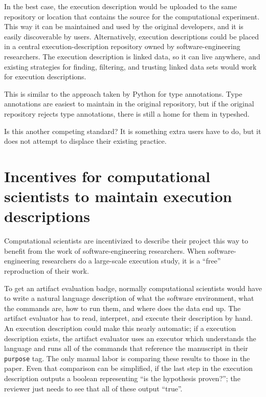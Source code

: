 \documentclass[manuscript,authordraft]{acmart}
\begin{document}
In the best case, the execution description would be uploaded to the
same repository or location that contains the source for the
computational experiment. This way it can be maintained and used by the
original developers, and it is easily discoverable by users.
Alternatively, execution descriptions could be placed in a central
execution-description repository owned by software-engineering
researchers. The execution description is linked data, so it can live
anywhere, and existing strategies for finding, filtering, and trusting
linked data sets would work for execution descriptions.

This is similar to the approach taken by Python for type annotations.
Type annotations are easiest to maintain in the original repository, but
if the original repository rejects type annotations, there is still a
home for them in typeshed.

Is this another competing standard? It is something extra users have to
do, but it does not attempt to displace their existing practice.

\hypertarget{incentives-for-computational-scientists-to-maintain-execution-descriptions}{%
\section{Incentives for computational scientists to maintain execution
descriptions}\label{incentives-for-computational-scientists-to-maintain-execution-descriptions}}

Computational scientists are incentivized to describe their project this
way to benefit from the work of software-engineering researchers. When
software-engineering researchers do a large-scale execution study, it is
a ``free'' reproduction of their work.

To get an artifact evaluation badge, normally computational scientists
would have to write a natural language description of what the software
environment, what the commands are, how to run them, and where does the
data end up. The artifact evaluator has to read, interpret, and execute
their description by hand. An execution description could make this
nearly automatic; if a execution description exists, the artifact
evaluator uses an executor which understands the language and runs all
of the commands that reference the manuscript in their \texttt{purpose}
tag. The only manual labor is comparing these results to those in the
paper. Even that comparison can be simplified, if the last step in the
execution description outputs a boolean representing ``is the hypothesis
proven?''; the reviewer just needs to see that all of these output
``true''.



%


\end{document}
